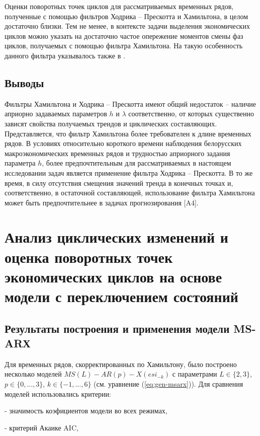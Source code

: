 \documentclass[a4paper,14pt]{extreport}
\begin{document}
	Оценки поворотных точек циклов для рассматриваемых временных рядов, полученные с помощью фильтров Ходрика -- Прескотта и Хамильтона, в целом достаточно близки. Тем не менее, в контексте задачи выделения экономических циклов можно указать на достаточно частое опережение моментов смены фаз циклов, получаемых с помощью фильтра Хамильтона. На такую особенность данного фильтра указывалось также в \cite{schuler_detrend}.
	
	\subsection{Выводы}
	
	Фильтры Хамильтона и Ходрика -- Прескотта  имеют  общий недостаток -- наличие априорно задаваемых параметров $h$ и $\lambda$ соответственно, от которых существенно зависят свойства получаемых трендов и циклических составляющих. Представляется, что фильтр Хамильтона более требователен к длине временных рядов.  В условиях относительно короткого времени наблюдения белорусских макроэкономических временных рядов и трудностью априорного задания параметра $h$, более предпочтительным для рассматриваемых в настоящем исследовании задач является применение фильтра Ходрика -- Прескотта. В то же время, в силу отсутствия смещения значений тренда в конечных точках и, соответственно, в остаточной составляющей, использование фильтра Хамильтона может быть предпочтительнее в  задачах прогнозирования [A4].
	

	\section{Анализ циклических изменений и оценка поворотных точек экономических циклов на основе модели с переключением состояний}
	
	\subsection{Результаты построения и применения модели MS-ARХ}
	
	Для временных рядов, скорректированных по Хамильтону, было построено несколько моделей $MS(L)-AR(p)-X(esi_{-k})$ с параметрами $L \in \{2,3\}$, $p \in \{0, ..., 3\}$, $k \in \{-1, ..., 6\}$ (см. уравнение (\ref{eq:gen-msarx})). Для сравнения моделей использовались критерии:
	
	- значимость коэфициентов модели во всех режимах,
	
	- критерий Акаике AIC,
	
\end{document}
